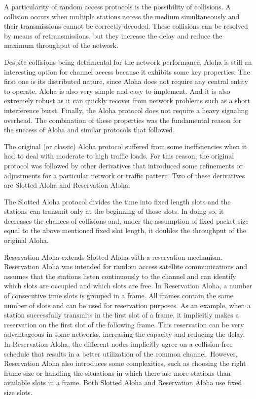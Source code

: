 \documentclass[journal]{IEEEtran}
\begin{document}
A particularity of random access protocols is the possibility of collisions.
A collision occurs when multiple stations access the medium simultaneously and their transmissions cannot be correctly decoded.
These collisions can be resolved by means of retransmissions, but they increase the delay and reduce the maximum throughput of the network.

Despite collisions being detrimental for the network performance, Aloha is still an interesting option for channel access because it exhibits some key properties.
The first one is its distributed nature, since Aloha does not require any central entity to operate.
Aloha is also very simple and easy to implement.
And it is also extremely robust as it can quickly recover from network problems such as a short interference burst.
Finally, the Aloha protocol does not require a heavy signaling overhead.
The combination of these properties was the fundamental reason for the success of Aloha and similar protocols that followed.


The original (or classic) Aloha protocol suffered from some inefficiencies when it had to deal with moderate to high traffic loads.
For this reason, the original protocol was followed by other derivatives that introduced some refinements or adjustments for a particular network or traffic pattern.
Two of these derivatives are Slotted Aloha and Reservation Aloha.

The Slotted Aloha protocol divides the time into fixed length slots and the stations can transmit only at the beginning of those slots.
In doing so, it decreases the chances of collisions and, under the assumption of fixed packet size equal to the above mentioned fixed slot length, it doubles the throughput of the original Aloha.

Reservation Aloha \cite{crowther1973sbc,tasaka1983spr} extends Slotted Aloha with a reservation mechanism.
Reservation Aloha was intended for random access satellite communications and assumes that the stations listen continuously to the channel and can identify which slots are occupied and which slots are free.
In  Reservation Aloha, a number of consecutive  time slots is grouped in a frame.
All frames contain the same number of slots and can be used for reservation purposes.
As an example, when a station successfully transmits in the first slot of a frame, it implicitly makes a reservation on the first slot of the following frame.
This reservation can be very advantageous in some networks, increasing the capacity and reducing the delay.
In Reservation Aloha, the different nodes implicitly agree on a collision-free schedule that results in a better utilization of the common channel.
However, Reservation Aloha also introduces some complexities, such as choosing the right frame size or handling the situations in which there are more stations than available slots in a frame.
Both Slotted Aloha and Reservation Aloha use fixed size slots.
\end{document}
